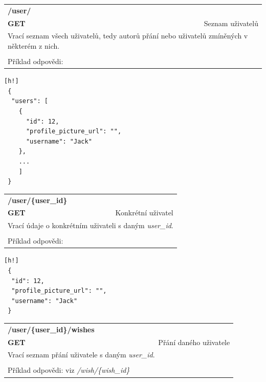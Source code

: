 \documentclass[thesis=B,czech]{FITthesis}[2012/06/26]
\begin{document}
\begin{table}[h]
\begin{tabular}{llllr}
\rowcolor[HTML]{EFEFEF}
\large \textbf{/user/}        &         &                 &        & \multicolumn{1}{l}{}                \\
\rowcolor[HTML]{EFEFEF}
\textbf{GET}          &         &                 &        & Seznam uživatelů                        \\
\multicolumn{5}{l}{\parbox[t]{12.8cm}{Vrací seznam všech uživatelů, tedy autorů přání nebo uživatelů zmíněných v některém z nich. }  } \\   
 & & & & \\
 Příklad odpovědi:
\end{tabular}
\end{table}

\begin{lstlisting}[nolol=true][h!]
 {
  "users": [
    {
      "id": 12,
      "profile_picture_url": "",
      "username": "Jack"
    },
    ...
    ]
 }
\end{lstlisting} 

\begin{table}[h]
\begin{tabular}{llllr}
\rowcolor[HTML]{EFEFEF}
\large \textbf{/user/\{user\_id\}}        &         &                 &        & \multicolumn{1}{l}{}                \\
\rowcolor[HTML]{EFEFEF}
\textbf{GET}          &         &                 &        & Konkrétní uživatel                        \\
\multicolumn{5}{l}{\parbox[t]{12.8cm}{Vrací údaje o konkrétním uživateli s daným \textit{user\_id}. }  } \\  
 & & & & \\
 Příklad odpovědi:
\end{tabular}
\end{table}

\begin{lstlisting}[nolol=true][h!]
 {
  "id": 12,
  "profile_picture_url": "",
  "username": "Jack"
 }
\end{lstlisting} 

\begin{table}[h]
\begin{tabular}{llllr}
\rowcolor[HTML]{EFEFEF}
\large \textbf{/user/\{user\_id\}/wishes}        &         &                 &        & \multicolumn{1}{l}{}                \\
\rowcolor[HTML]{EFEFEF}
\textbf{GET}          &         &                 &        & Přání daného uživatele                        \\
\multicolumn{5}{l}{\parbox[t]{12.8cm}{Vrací seznam přání uživatele s daným \textit{user\_id}. }  } \\  
 & & & & \\
 Příklad odpovědi: viz \textit{/wish/\{wish\_id\}}
\end{tabular}
\end{table}
\end{document}
